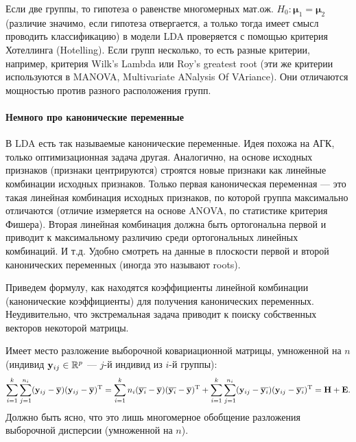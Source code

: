 \begin{note}
  Если две группы, то гипотеза о равенстве многомерных мат.ож. $H_0: \bm{\mu}_1 = \bm{\mu}_2$ (различие значимо, если гипотеза отвергается, а только тогда имеет смысл проводить классификацию) в модели LDA проверяется с помощью критерия Хотеллинга (Hotelling). Если групп несколько, то есть разные критерии, например, критерия Wilk's Lambda или Roy's greatest root (эти же критерии используются в MANOVA, Multivariate ANalysis Of VAriance). Они отличаются мощностью против разного расположения групп.
\end{note}

\paragraph{Немного про канонические переменные}
В LDA есть так называемые канонические переменные. Идея похожа на АГК, только оптимизационная задача другая. Аналогично, на основе исходных признаков (признаки центрируются) строятся новые признаки как линейные комбинации исходных признаков. Только первая каноническая переменная --- это такая линейная комбинация исходных признаков, по которой группа максимально отличаются (отличие измеряется на основе ANOVA, по статистике критерия Фишера). Вторая линейная комбинация должна быть ортогональна первой и приводит к максимальному различию среди ортогональных линейных комбинаций. И т.д. Удобно смотреть на данные в плоскости первой и второй канонических переменных (иногда это называют roots).

\medskip
Приведем формулу, как находятся коэффициенты линейной комбинации (канонические коэффициенты) для получения канонических переменных. Неудивительно, что экстремальная задача приводит к поиску собственных векторов некоторой матрицы.

Имеет место разложение выборочной ковариационной матрицы, умноженной на $n$ (индивид $\mathbf y_{ij} \in \mathbb{R}^p$ --- $j$-й индивид из $i$-й группы):
\begin{gather}
    \label{VI_MANOVA}
    \sum_{i=1}^k \sum_{j=1}^{n_i} (\mathbf y_{ij} - \overline {\mathbf y}) (\mathbf y_{ij} - \overline {\mathbf y})^{\mathrm{T}} =
    \sum_{i=1}^k n_i (\overline {\mathbf y_i} - \overline {\mathbf y}) (\overline {\mathbf y_i} - \overline {\mathbf y})^{\mathrm{T}} +
    \sum_{i=1}^k \sum_{j=1}^{n_i} (\mathbf y_{ij} - \overline {\mathbf y_i}) (\mathbf y_{ij} - \overline {\mathbf y_i})^{\mathrm{T}}
    = \mathbf{H}  + \mathbf{E}.
\end{gather}
Должно быть ясно, что это лишь многомерное обобщение разложения выборочной дисперсии (умноженной на $n$).

